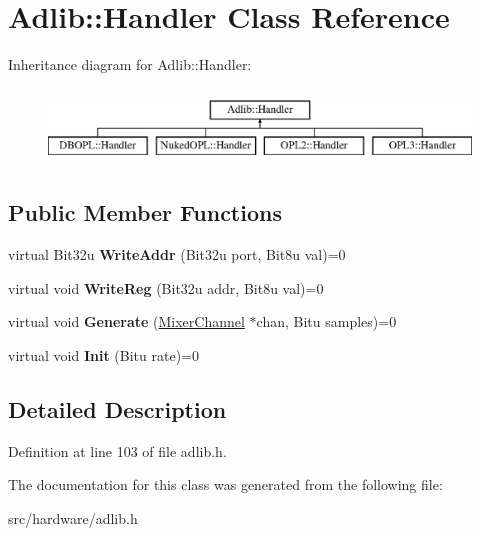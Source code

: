 \hypertarget{classAdlib_1_1Handler}{\section{Adlib\-:\-:Handler Class Reference}
\label{classAdlib_1_1Handler}
}
Inheritance diagram for Adlib\-:\-:Handler\-:\begin{figure}[H]
\begin{center}
\leavevmode
\includegraphics[height=2.000000cm]{classAdlib_1_1Handler}
\end{center}
\end{figure}
\subsection*{Public Member Functions}
\begin{DoxyCompactItemize}
\item 
\hypertarget{classAdlib_1_1Handler_aecfd94a9fc9c688bdb4029610f12cc8f}{virtual Bit32u {\bfseries Write\-Addr} (Bit32u port, Bit8u val)=0}\label{classAdlib_1_1Handler_aecfd94a9fc9c688bdb4029610f12cc8f}

\item 
\hypertarget{classAdlib_1_1Handler_a002f7eb216a517e9e1afa258fd9646fc}{virtual void {\bfseries Write\-Reg} (Bit32u addr, Bit8u val)=0}\label{classAdlib_1_1Handler_a002f7eb216a517e9e1afa258fd9646fc}

\item 
\hypertarget{classAdlib_1_1Handler_a1bde8d54a3e567e256b969c5ae1c3e3c}{virtual void {\bfseries Generate} (\hyperlink{classMixerChannel}{Mixer\-Channel} $\ast$chan, Bitu samples)=0}\label{classAdlib_1_1Handler_a1bde8d54a3e567e256b969c5ae1c3e3c}

\item 
\hypertarget{classAdlib_1_1Handler_acfb5d8e5e01a30b2ffb6efe99be71844}{virtual void {\bfseries Init} (Bitu rate)=0}\label{classAdlib_1_1Handler_acfb5d8e5e01a30b2ffb6efe99be71844}

\end{DoxyCompactItemize}


\subsection{Detailed Description}


Definition at line 103 of file adlib.\-h.



The documentation for this class was generated from the following file\-:\begin{DoxyCompactItemize}
\item 
src/hardware/adlib.\-h\end{DoxyCompactItemize}
